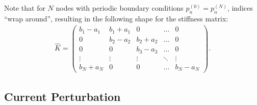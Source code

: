 Note that for $N$ nodes with periodic boundary conditions $p_{n}^{(0)} = p_{n}^{(N)}$, indices \enquote{wrap around}, resulting in the following shape for the stiffness matrix:
\begin{gather*}
  \hat{K} = \begin{pmatrix}
    b_{1} - a_{1} &  b_{1} + a_{1} &        0       & \hdots &    0   \\
           0       & b_{2} - a_{2} &  b_{2} + a_{2} & \hdots &    0   \\
           0       &        0       & b_{3} - a_{3} & \hdots &    0   \\
        \vdots     &     \vdots     &     \vdots     & \ddots & \vdots \\
     b_{N} + a_{N} &        0       &        0       & \hdots & b_{N} - a_{N}
  \end{pmatrix}.
\end{gather*}

\subsection{Current Perturbation}
\label{sec:compute_currn}

